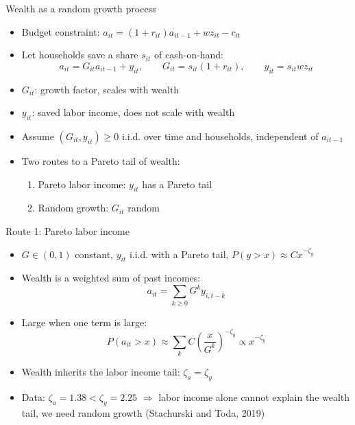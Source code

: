 \documentclass[10pt,english,10pt]{beamer}
\begin{document}
\begin{frame}{Wealth as a random growth process}
\begin{itemize}
\item Budget constraint: $a_{it}=(1+r_{it})a_{it-1}+wz_{it}-c_{it}$
\item Let households save a share $s_{it}$ of cash-on-hand:
\[
a_{it}=G_{it}a_{it-1}+y_{it},\qquad G_{it}=s_{it}(1+r_{it}),\qquad y_{it}=s_{it}wz_{it}
\]
\item $G_{it}$: growth factor, scales with wealth
\item $y_{it}$: saved labor income, does not scale with wealth
\item Assume $(G_{it},y_{it})\geq0$ i.i.d. over time and households, independent of $a_{it-1}$
\item Two routes to a Pareto tail of wealth:
\begin{enumerate}
\item Pareto labor income: $y_{it}$ has a Pareto tail
\item Random growth: $G_{it}$ random
\end{enumerate}
\end{itemize}
\end{frame}

\begin{frame}{Route 1: Pareto labor income}
\begin{itemize}
\item $G\in(0,1)$ constant, $y_{it}$ i.i.d. with a Pareto tail, $P(y>x)\approx Cx^{-\zeta_{y}}$
\item Wealth is a weighted sum of past incomes:
\[
a_{it}=\sum_{k\geq0}G^{k}y_{i,t-k}
\]
\item Large when one term is large:
\[
P(a_{it}>x)\approx\sum_{k}C\left(\frac{x}{G^{k}}\right)^{-\zeta_{y}}\propto x^{-\zeta_{y}}
\]
\item Wealth inherits the labor income tail: $\zeta_{a}=\zeta_{y}$
\item Data: $\zeta_{a}=1.38<\zeta_{y}=2.25$ $\Rightarrow$ labor income alone cannot explain the wealth tail, we need random growth (Stachurski and Toda, 2019)
\end{itemize}
\end{frame}
\end{document}
